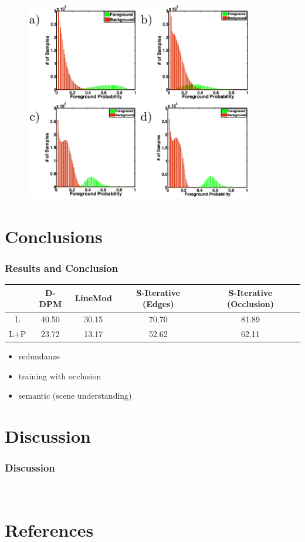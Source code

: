 \documentclass[xcolor=dvipsnames]{beamer}
\begin{document}
\begin{frame}
	\begin{figure}
	\includegraphics[width=10cm]{img/rir_1.png}
	\end{figure}
\end{frame}

\section{Conclusions}

\begin{frame}
	\frametitle{Results and Conclusion}
	
	\begin{center}
		\small
		\begin{tabular}{c|c|c|c|c}
			& D-DPM & LineMod & S-Iterative (Edges) & S-Iterative (Occlusion) \\
			\hline
			L & 40.50 & 30.15 & 70.70 & 81.89 \\
			L+P & 23.72 & 13.17 & 52.62 & 62.11 \\
		
		\end{tabular}
	\end{center}
	
	\begin{itemize}
		\item redundanze
		\item training with occlusion
		\item semantic (scene understanding)
	\end{itemize}
\end{frame}

\section{Discussion}
{ 
\begin{frame}
	\frametitle{Discussion}
	\begin{center}
		{\fontsize{120}{48} \selectfont \textcolor{white}{?}}
	\end{center}
\end{frame}}

\section{References}
\begin{frame}[t,allowframebreaks]
	\nocite{*}
	\printbibliography
\end{frame}
\end{document}
